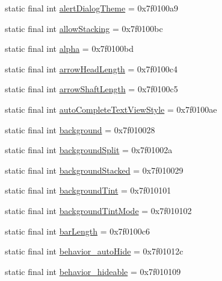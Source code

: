 \begin{CompactItemize}
\item 
static final int \hyperlink{classandroid_1_1support_1_1transition_1_1_r_1_1attr_09ce7b25ce5ed91ee131d04e9b4e5412}{alertDialogTheme} = 0x7f0100a9
\item 
static final int \hyperlink{classandroid_1_1support_1_1transition_1_1_r_1_1attr_c5b74a19ff76e9f008c44e6c312b6dc1}{allowStacking} = 0x7f0100bc
\item 
static final int \hyperlink{classandroid_1_1support_1_1transition_1_1_r_1_1attr_ef0c14b8294638efcedc2a756e6d7dd1}{alpha} = 0x7f0100bd
\item 
static final int \hyperlink{classandroid_1_1support_1_1transition_1_1_r_1_1attr_2e4c7496fdc15b22fa0e73c26a9f111b}{arrowHeadLength} = 0x7f0100c4
\item 
static final int \hyperlink{classandroid_1_1support_1_1transition_1_1_r_1_1attr_ea7c6d144dd88c56e20fc3b8af8d02a4}{arrowShaftLength} = 0x7f0100c5
\item 
static final int \hyperlink{classandroid_1_1support_1_1transition_1_1_r_1_1attr_9813ac8c33bcd7f5cbf9cbea09917821}{autoCompleteTextViewStyle} = 0x7f0100ae
\item 
static final int \hyperlink{classandroid_1_1support_1_1transition_1_1_r_1_1attr_ba62ead52d1c8e11386d836f2a630cc5}{background} = 0x7f010028
\item 
static final int \hyperlink{classandroid_1_1support_1_1transition_1_1_r_1_1attr_35bcf2c9f9ae685b14144fe953ff598f}{backgroundSplit} = 0x7f01002a
\item 
static final int \hyperlink{classandroid_1_1support_1_1transition_1_1_r_1_1attr_0230ee2a9e2b4a56250fc3512c082d81}{backgroundStacked} = 0x7f010029
\item 
static final int \hyperlink{classandroid_1_1support_1_1transition_1_1_r_1_1attr_bb7af7305bdd56423e5421486b4cf4af}{backgroundTint} = 0x7f010101
\item 
static final int \hyperlink{classandroid_1_1support_1_1transition_1_1_r_1_1attr_5ebcb7ed92cd974fd659c4320703cb7a}{backgroundTintMode} = 0x7f010102
\item 
static final int \hyperlink{classandroid_1_1support_1_1transition_1_1_r_1_1attr_9890f25d14253620ae166fabbe152370}{barLength} = 0x7f0100c6
\item 
static final int \hyperlink{classandroid_1_1support_1_1transition_1_1_r_1_1attr_f719ee51da8db5ae28c47cfb89a325e6}{behavior\_\-autoHide} = 0x7f01012c
\item 
static final int \hyperlink{classandroid_1_1support_1_1transition_1_1_r_1_1attr_3e2f80ec90edef8b697df430cfc91dad}{behavior\_\-hideable} = 0x7f010109

\end{CompactItemize}

